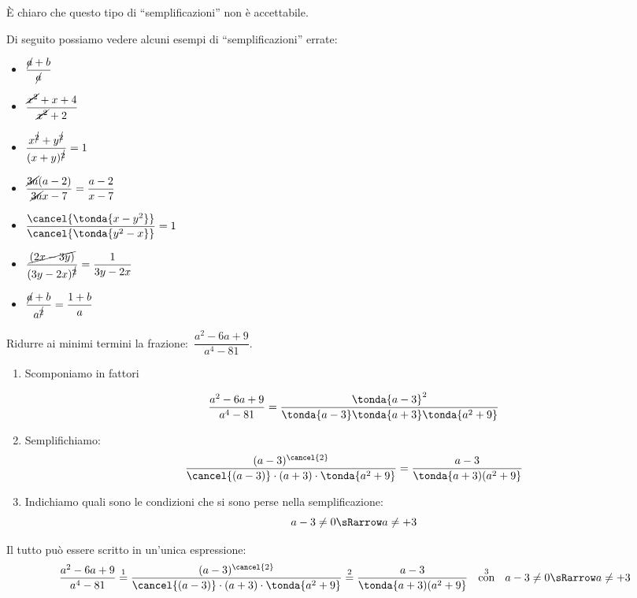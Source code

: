 È chiaro che questo tipo di ``semplificazioni'' non è accettabile.

Di seguito possiamo vedere alcuni esempi di ``semplificazioni'' errate:
\begin{multicols}{2}
\begin{itemize}
 \item \(\dfrac{\cancel{a}+b}{\cancel{a}}\)
 \item \(\dfrac{\cancel{x^2}+x+4}{\cancel{x^2}+2}\) 
 \item \(\dfrac{x^{\cancel{2}}+y^{\cancel{2}}}{(x+y)^{\cancel{2}}}=1\) 
 \item \(\dfrac{\cancel{3a}(a-2)}{\cancel{3a}x-7}=\dfrac{a-2}{x-7}\) 
 \item \(\dfrac{\cancel{ \tonda{x-y^2}}}
              {\cancel{ \tonda{y^2-x}}}=1\)
 \item \(\dfrac{\cancel{(2x-3y)}}{(3y-2x)^{\cancel{2}}}=\dfrac{1}{3y-2x}\) 
 \item \(\dfrac{\cancel{a}+b}{a^{\cancel{2}}}=\dfrac{1+b}{a}\)
\end{itemize}
\end{multicols}

 \begin{esempio}
Ridurre ai minimi termini la frazione:~\(\dfrac{a^{2}-6a+9}{a^{4}-81}\).
\begin{enumerate}
 \item Scomponiamo in fattori
 \[\dfrac{a^{2}-6a+9}{a^{4}-81} = 
   \dfrac{\tonda{a-3}^2}
         {\tonda{a-3} \tonda{a+3} \tonda{a^{2}+9}}\]
 \item Semplifichiamo:
 \[\dfrac{(a-3)^{\cancel{2}}}
         {\cancel{(a-3)}\cdot (a+3)\cdot  \tonda{a^{2}+9} }=
   \dfrac{a-3}{\tonda{a+3)(a^{2}+9}}\]
 \item Indichiamo quali sono le condizioni che si sono perse nella 
semplificazione:
 \[a-3 \neq 0 \sRarrow a \neq +3\]
\end{enumerate}
Il tutto può essere scritto in un'unica espressione:
 \[\dfrac{a^{2}-6a+9}{a^{4}-81} \stackrel{1}{=} 
   \dfrac{(a-3)^{\cancel{2}}}
         {\cancel{(a-3)}\cdot (a+3)\cdot \tonda{a^{2}+9}}\stackrel{2}{=} 
   \dfrac{a-3}{ \tonda{a+3)(a^{2}+9}} \stackrel{3}{\stext{con}} 
   a-3 \neq 0 \sRarrow a \neq +3\]
 \end{esempio}

